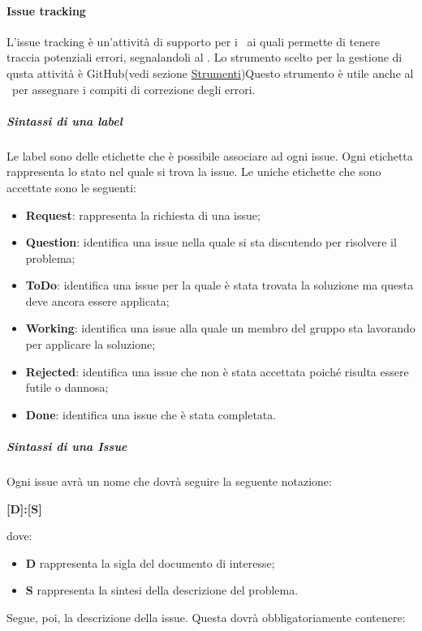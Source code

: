 \documentclass[../NormeProgetto.tex]{subfiles}
\begin{document}
		\paragraph{Issue tracking}
		L'issue tracking è un'attività di supporto per i \verificatori\ ai quali permette di tenere traccia potenziali errori, segnalandoli al \responsabilediprogetto. Lo strumento scelto per la gestione di qusta attività è GitHub(vedi sezione \hyperref[par:IssueTrk GitHub]{Strumenti})Questo strumento è utile anche al \responsabilediprogetto\ per assegnare i compiti di correzione degli errori. 
			\subparagraph{Sintassi di una label}
		Le label sono delle etichette che è possibile associare ad ogni issue. Ogni etichetta rappresenta lo stato nel quale si trova la issue. Le uniche etichette che sono accettate sono le seguenti:
			\begin{itemize}
				\item \textbf{Request}: rappresenta la richiesta di una issue;
				\item \textbf{Question}: identifica una issue nella quale si sta discutendo per risolvere il problema;
				\item \textbf{ToDo}: identifica una issue per la quale è stata trovata la soluzione ma questa deve ancora essere applicata;
				\item \textbf{Working}: identifica una issue alla quale un membro del gruppo sta lavorando per applicare la soluzione;
				\item \textbf{Rejected}: identifica una issue che non è stata accettata poiché risulta essere futile o dannosa;
				\item \textbf{Done}: identifica una issue che è stata completata.
			\end{itemize}				
			\subparagraph{Sintassi di una Issue}
		Ogni issue avrà un nome che dovrà seguire la seguente notazione: \begin{center}\textbf{[D]:[S]}\end{center} dove:
			\begin{itemize} 
				\item \textbf{D} rappresenta la sigla del documento di interesse;
				\item \textbf{S} rappresenta la sintesi della descrizione del problema.
			\end{itemize}
			Segue, poi, la descrizione della issue. Questa dovrà obbligatoriamente contenere:
\end{document}
